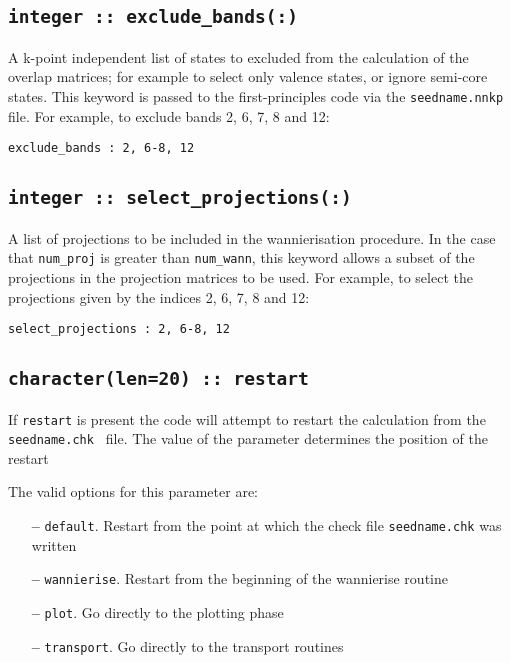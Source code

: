 \subsection[exclude\_bands]{\tt integer :: exclude\_bands(:)}

A k-point independent list of states to excluded from the calculation
 of the overlap matrices;
 for example to select only valence states, or ignore semi-core states.
 This keyword is passed to the first-principles code via the
 {\tt seedname.nnkp} file. For example, to exclude bands 2, 6, 7, 8
 and 12:

 \verb#exclude_bands : 2, 6-8, 12#

\subsection[select\_projections]{\tt integer :: select\_projections(:)}

A list of projections to be included in the wannierisation procedure.
In the case that \verb#num_proj# is greater than \verb#num_wann#,
  this keyword allows a subset of the projections in the projection matrices to be used.
For example, to select the projections given by the indices 2, 6, 7, 8 and 12:

 \verb#select_projections : 2, 6-8, 12#

\subsection[restart]{\tt character(len=20) :: restart}

If \verb#restart# is present the code will attempt to restart the calculation
from the {\tt seedname.chk } file. The value of the parameter
determines the position of the restart

The valid options for this parameter are:
\begin{itemize}
\item[{\bf --}]  \verb#default#. Restart from the point at which the
  check file {\tt seedname.chk} was written
\item[{\bf --}]  \verb#wannierise#. Restart from the beginning of the
  wannierise routine
\item[{\bf --}]  \verb#plot#. Go directly to the plotting phase
\item[{\bf --}]  \verb#transport#. Go directly to the transport routines


\end{itemize}



